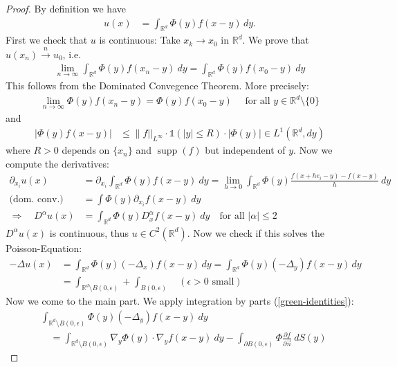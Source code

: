 \documentclass{report}
\theoremstyle{tommy}
\begin{document}
\begin{proof}
  By definition we have
  \begin{align*}
    u(x) &= \int_{\mathbb{R}^d} \Phi(y) f(x-y) \, dy.
  \end{align*}
  First we check that \(u\) is continuous: Take \(x_k \to x_0\) in \(\mathbb{R}^d\). We prove that \(u(x_n) \xrightarrow{n} u_0\), i.e.
  \begin{align*}
    \lim_{n \to \infty} \int_{\mathbb{R}^d} \Phi(y) f(x_n - y) \ dy = \int_{\mathbb{R}^d} \Phi(y) f(x_0 - y) \ dy
  \end{align*}
  This follows from the Dominated Convegence Theorem. More precisely:
  \begin{align*}
    \lim_{n \to \infty} \Phi(y) f(x_n -y) = \Phi(y) f(x_0 - y) \quad \text{ for all } y \in \mathbb{R}^d \setminus \{0\}
  \end{align*}
  and 
  \begin{align*}
    |\Phi(y) f(x-y)| &\le \| f ||_{L^\infty} \cdot \mathbb{1}(|y| \le R) \cdot |\Phi(y)| \in L^1(\mathbb{R}^d, dy)
  \end{align*}
  where \(R > 0\) depends on \(\{x_n\}\) and \(\operatorname{supp}(f)\) but independent of \(y\). Now we compute the derivatives:
  \begin{align*}
    \partial_{x_i} u(x) 
    &= \partial_{x_i} \int_{\mathbb{R}^d} \Phi(y) f(x-y) \ dy
    = \lim_{h \to 0} \int_{\mathbb{R}^d} \Phi(y) \frac{f(x + h e_i - y) - f(x-y)}{h} \ dy \\
    \text{(dom. conv.)} \quad &= \int \Phi(y) \partial_{x_i} f(x-y) \ dy \\
    \Rightarrow \quad D^\alpha u(x) &= \int_{\mathbb{R}^d} \Phi(y) D_x^\alpha f(x-y) \ dy \quad \text{for all } |\alpha| \le 2
  \end{align*}
  \(D^\alpha u(x)\)  is continuous, thus \(u \in C^2(\mathbb{R}^d)\).
  Now we check if this solves the Poisson-Equation:
  \begin{align*}
    - \Delta u(x) 
    &= \int_{\mathbb{R}^d} \Phi(y) (-\Delta_x) f(x-y) \, dy
    = \int_{\mathbb{R}^d} \Phi(y) (-\Delta_y) f(x-y) \, dy \\
    &= \int_{\mathbb{R}^d \setminus B(0, \epsilon)} + \int_{B(0, \epsilon)} \quad (\epsilon > 0 \text{ small})
  \end{align*}
  Now we come to the main part. We apply integration by parts (\ref{green-identities}):
  \begin{align*}
    &\int_{\mathbb{R}^d \setminus B(0, \epsilon)} \Phi(y)(- \Delta_y) f(x-y) \ dy \\
    &\quad = \int_{\mathbb{R}^d \setminus B(0, \epsilon)} \nabla_y \Phi(y) \cdot \nabla_y f(x-y) \ dy - \int_{\partial B(0, \epsilon)} \Phi \frac{\partial f}{\partial \vec{n}} \ dS(y)
  \end{align*}


\end{proof}
\end{document}
